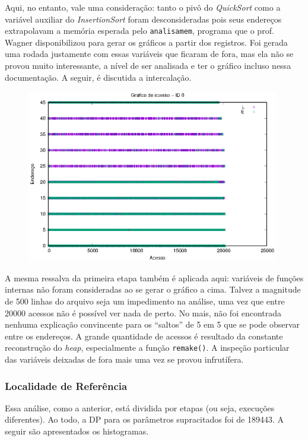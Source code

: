 \documentclass{article}
\def\code#1{\texttt{#1}}
\begin{document}
Aqui, no entanto, vale uma consideração: tanto o pivô do \textit{QuickSort} como a variável auxiliar do \textit{InsertionSort} foram desconsideradas pois seus endereços extrapolavam a memória esperada pelo \code{analisamem}, programa que o prof. Wagner disponibilizou para gerar os gráficos a partir dos registros. Foi gerada uma rodada justamente com essas variáveis que ficaram de fora, mas ela não se provou muito interessante, a nível de ser analisada e ter o gráfico incluso nessa documentação. A seguir, é discutida a intercalação.

\begin{figure}[H]
	\includegraphics[width=11cm]{2a-fase-acesso-0.eps}
	\centering
\end{figure}

A mesma ressalva da primeira etapa também é aplicada aqui: variáveis de funções internas não foram consideradas ao se gerar o gráfico a cima. Talvez a magnitude de 500 linhas do arquivo seja um impedimento na análise, uma vez que entre 20000 acessos não é possível ver nada de perto. No mais, não foi encontrada nenhuma explicação convincente para os ``saltos'' de 5 em 5 que se pode observar entre os endereços. A grande quantidade de acessos é resultado da constante reconstrução do \textit{heap}, especialmente a função \code{remake()}. A inspeção particular das variáveis deixadas de fora mais uma vez se provou infrutífera.

\subsubsection{Localidade de Referência}

Essa análise, como a anterior, está dividida por etapas (ou seja, execuções diferentes). Ao todo, a DP para os parâmetros supracitados foi de 189443. A seguir são apresentados os histogramas.
\end{document}

